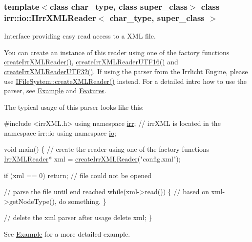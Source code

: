 \subsubsection*{template$<$class char\+\_\+type, class super\+\_\+class$>$\newline
class irr\+::io\+::\+I\+Irr\+X\+M\+L\+Reader$<$ char\+\_\+type, super\+\_\+class $>$}

Interface providing easy read access to a X\+ML file. 

You can create an instance of this reader using one of the factory functions \hyperlink{namespaceirr_1_1io_a638e38fd4c6d6e40ce4f332be6a3b570}{create\+Irr\+X\+M\+L\+Reader()}, \hyperlink{namespaceirr_1_1io_a2b7451dc3f1606c80bf46be9ccc955d9}{create\+Irr\+X\+M\+L\+Reader\+U\+T\+F16()} and \hyperlink{namespaceirr_1_1io_a69d4b7a461a7a0b8715d346bbe9a49b0}{create\+Irr\+X\+M\+L\+Reader\+U\+T\+F32()}. If using the parser from the Irrlicht Engine, please use \hyperlink{classirr_1_1io_1_1IFileSystem_a167c9fa159d16ee5c56c074636b0865e}{I\+File\+System\+::create\+X\+M\+L\+Reader()} instead. For a detailed intro how to use the parser, see \hyperlink{irrXML.h_irrxmlexample}{Example} and \hyperlink{irrXML.h_features}{Features}.

The typical usage of this parser looks like this\+: 
\begin{DoxyCode}
\textcolor{preprocessor}{#include <irrXML.h>}
\textcolor{keyword}{using namespace }\hyperlink{namespaceirr}{irr}; \textcolor{comment}{// irrXML is located in the namespace irr::io}
\textcolor{keyword}{using namespace }\hyperlink{namespaceio}{io};

\textcolor{keywordtype}{void} main()
\{
    \textcolor{comment}{// create the reader using one of the factory functions}
    \hyperlink{namespaceirr_1_1io_a682f8a2c4c57259bfde1ec8fa27a565b}{IrrXMLReader}* xml = \hyperlink{namespaceirr_1_1io_a638e38fd4c6d6e40ce4f332be6a3b570}{createIrrXMLReader}(\textcolor{stringliteral}{"config.xml"});

    \textcolor{keywordflow}{if} (xml == 0)
        \textcolor{keywordflow}{return}; \textcolor{comment}{// file could not be opened}

    \textcolor{comment}{// parse the file until end reached}
    \textcolor{keywordflow}{while}(xml->read())
    \{
        \textcolor{comment}{// based on xml->getNodeType(), do something.}
    \}

    \textcolor{comment}{// delete the xml parser after usage}
    \textcolor{keyword}{delete} xml;
\}
\end{DoxyCode}
 See \hyperlink{irrXML.h_irrxmlexample}{Example} for a more detailed example. 

